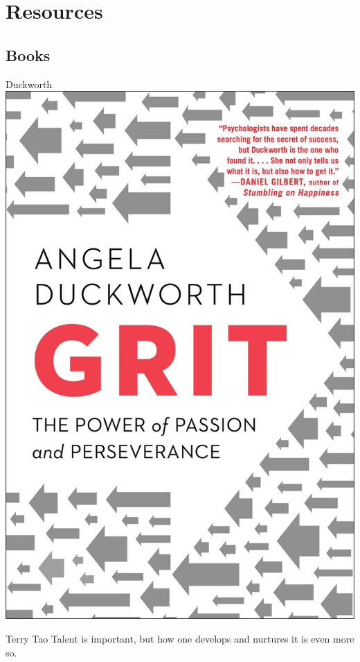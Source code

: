 \chapter{Resources}
\section{Books}
\begin{boxResource}[lefthand width=5cm, sidebyside]{Duckworth}
\includegraphics[width=\textwidth]{./img/Duckworth_Grit}
\tcblower
\begin{boxQuote}{Terry Tao}
Talent is important, but how one develops and nurtures it is even more so.
\end{boxQuote}


\end{boxResource}
